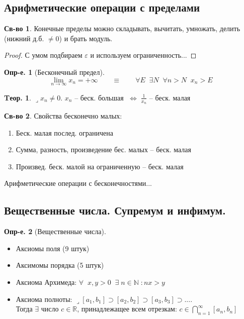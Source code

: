 \documentclass[a4paper,12pt]{article}
\numberwithin{figure}{section}
\theoremstyle{definition}
\newtheorem{definition}{Опр-е.}[section]
\newtheorem*{property}{Св-во}   %
\newtheorem{theorem}{Tеор.}[section]
\def\DS{\displaystyle}
\def\NN{\mathbb{N}}
\def\RR{\mathbb{R}}
\def\.{\;\;}
\def\eps{\varepsilon}
\def\ntoinf{n\to\infty}
\def\lets{{\huge$\lrcorner$}\space}
\def\iff{$\;\Longleftrightarrow\;$}
\begin{document}
\subsection{Арифметические операции с пределами}

\begin{property}
	Конечные пределы можно складывать, вычитать, умножать,
	делить (нижний д.б. $\ne0$) и брать модуль.
\end{property}
\begin{proof} С умом подбираем $\eps$ и используем ограниченность... \end{proof}


\begin{definition}[Бесконечный предел] \[
	\lim_{\ntoinf} x_n = +\infty
	\qquad\equiv\qquad
	\forall E \. \exists N \. \forall n>N \. x_n>E
\]
\end{definition}

\begin{theorem}
	\lets $x_n \neq 0$. $x_n$ -- беск. большая \iff $\DS\frac1{x_n}$ -- беск. малая
\end{theorem}

\begin{property}
	Свойства бесконечно малых:
	\begin{enumerate}
		\item Беск. малая послед. ограничена
		\item Сумма, разность, произведение бес. малых -- беск. малая
		\item Произвед. беск. малой на ограниченную -- беск. малая
	\end{enumerate}
\end{property}

\medskip
Арифметические операции с бесконечностями...


\subsection{Вещественные числа. Супремум и инфимум.}

\begin{definition}[Вещественные числа]
	\leavevmode
	\begin{itemize}
		\item Аксиомы поля (9 штук)
		\item Аксимомы порядка (5 штук)
		\item Аксиома Архимеда:
				$ \forall\. x,y>0 \. \exists \; n \in \NN \;: nx>y $
		\item Аксиома полноты:
			\lets $[a_1,b_1] \supset [a_2,b_2] \supset [a_3,b_3] \supset...$.
			\\Тогда $\exists$ число $c \in \RR$, принадлежащее всем отрезкам:
			$\DS c \in \bigcap_{n=1}^{\infty} [a_n,b_n]$
	\end{itemize}
\end{definition}
\end{document}
